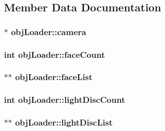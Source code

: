 \subsection{Member Data Documentation}
\hypertarget{classobj_loader_ae3816c50d52bea3f75868e8e2f93e973}{
\subsubsection[{camera}]{$\ast$ obj\+Loader\+::camera}}\label{classobj_loader_ae3816c50d52bea3f75868e8e2f93e973}
\hypertarget{classobj_loader_a173464115217958dfc859b4dfefb87f4}{
\subsubsection[{face\+Count}]{\setlength{\rightskip}{0pt plus 5cm}int obj\+Loader\+::face\+Count}}\label{classobj_loader_a173464115217958dfc859b4dfefb87f4}
\hypertarget{classobj_loader_a06d7d817bb96eb5e933c24edb6b9e20e}{
\subsubsection[{face\+List}]{$\ast$$\ast$ obj\+Loader\+::face\+List}}\label{classobj_loader_a06d7d817bb96eb5e933c24edb6b9e20e}
\hypertarget{classobj_loader_ad8c5f632591635bac2a11dd2f94f4f19}{
\subsubsection[{light\+Disc\+Count}]{\setlength{\rightskip}{0pt plus 5cm}int obj\+Loader\+::light\+Disc\+Count}}\label{classobj_loader_ad8c5f632591635bac2a11dd2f94f4f19}
\hypertarget{classobj_loader_ab287d51395930cc0db3d15c046ca6102}{
\subsubsection[{light\+Disc\+List}]{$\ast$$\ast$ obj\+Loader\+::light\+Disc\+List}}\label{classobj_loader_ab287d51395930cc0db3d15c046ca6102}

